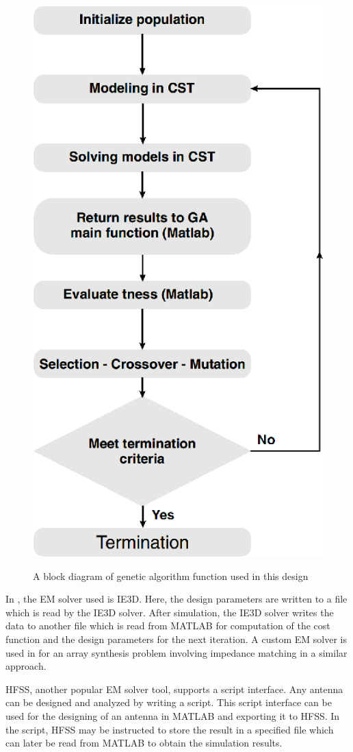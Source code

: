 \begin{figure}
  \centering
  \includegraphics[width=0.4\linewidth]{fig_2_7.eps}\\
  \caption[A block diagram of genetic algorithm function used in this design]{A block diagram of genetic algorithm function used in this design \cite{patch_miniaturize_ga}} \label{fig_2_7}
\end{figure}

In \cite{optPatch}, the EM solver used is IE3D. Here, the design parameters are written to a file which is read by the IE3D solver. After simulation, the IE3D solver writes the data to another file which is read from MATLAB for computation of the cost function and the design parameters for the next iteration. A custom EM solver is used in \cite{arraySynth1} for an array synthesis problem involving impedance matching in a similar approach.

HFSS, another popular EM solver tool, supports a script interface. Any antenna can be designed and analyzed by writing a script. This script interface can be used for the designing of an antenna in MATLAB and exporting it to HFSS. In the script, HFSS may be instructed to store the result in a specified file which can later be read from MATLAB to obtain the simulation results.

